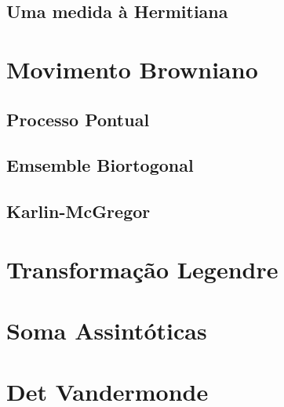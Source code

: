 \documentclass[11pt,oneside,a4paper]{report}
\begin{document}
\section{Uma medida à Hermitiana}


\chapter{Movimento Browniano}


\section{Processo Pontual}


\section{Emsemble Biortogonal}


\section{Karlin-McGregor}


{}


\appendix
\chapter{Transformação Legendre}
\label{apdx: legendre}


\chapter{Soma Assintóticas}
\label{apdx: somaassin}


\chapter{Det Vandermonde}
\label{apdx: vandermonde}

\end{document}
